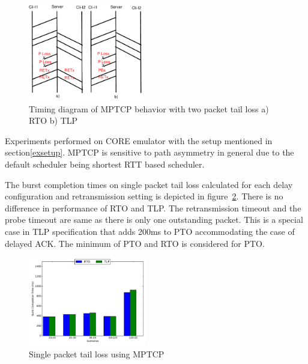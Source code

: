 \documentclass[10pt,draftcls,twocolumn]{IEEEconf}
\begin{document}
\begin{figure}[!ht]
\begin{center}
\includegraphics[angle=0, width=0.45\textwidth, natwidth=610, natheight=400]{images/timing2P.pdf}
\end{center}
\caption{Timing diagram of MPTCP behavior with two packet tail loss a) RTO b) TLP}\label{timing2P}
\end{figure}



Experiments performed on CORE emulator with the setup mentioned in section\ref{exsetup}.
MPTCP is sensitive to path asymmetry in general due to the default scheduler being shortest RTT based scheduler.

The burst completion times on single packet tail loss calculated for each delay configuration and retransmission 
setting is depicted in figure~\ref{1p}. There is no difference in performance of RTO and TLP. The retransmission
timeout and the probe timeout are same as there is only one outstanding packet. This is a special case in TLP
specification that adds 200ms to PTO accommodating the case of delayed ACK. The minimum of PTO and RTO is considered
for PTO.

\begin{figure}[!ht]
\begin{center}
\includegraphics[angle=0, width=0.46\textwidth,natwidth=578.16,natheight=433.62]{plots/1P.pdf}
\caption{Single packet tail loss using MPTCP}\label{1p}
\end{center}
\end{figure}
\end{document}

